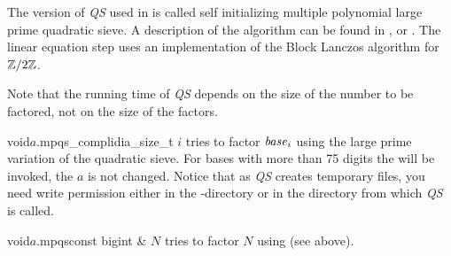The version of \emph{QS} used in \LiDIA is called self initializing multiple polynomial large
prime quadratic sieve.  A description of the algorithm can be found in
\cite{Alford/Pomerance:1993}, \cite{Denny_Thesis:1993} or \cite{Sosnowski_Thesis:1994}.  The
linear equation step uses an implementation of the Block Lanczos algorithm for $\mathbb{Z}/2\mathbb{Z}$.

Note that the running time of \emph{QS} depends on the size of the number to be factored, not on
the size of the factors.

\begin{fcode}{void}{$a$.mpqs_comp}{lidia_size_t $i$}
  tries to factor $\mathit{base}_i$ using the large prime variation of the quadratic sieve.  For bases
  with more than 75 digits the  will be invoked, the
   $a$ is not changed.  Notice that as \emph{QS} creates temporary
  files, you need write permission either in the -directory or in the directory from
  which \emph{QS} is called.
\end{fcode}

\begin{fcode}{void}{$a$.mpqs}{const bigint & $N$}
  tries to factor $N$ using  (see above).
\end{fcode}


